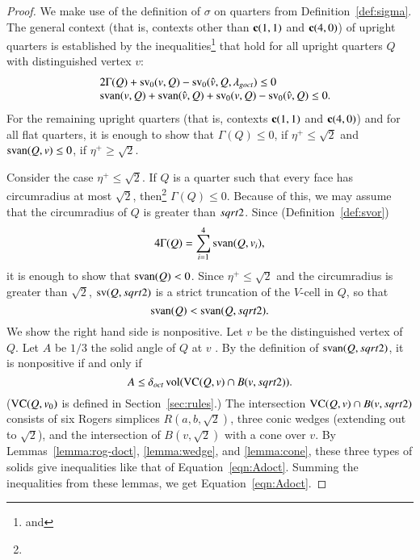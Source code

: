 \begin{proof}  
We make use
of the definition of $\sigma$ on quarters from
Definition~\ref{def:sigma}. The general context (that is, contexts
other than ${\operatorname{\bf c}}{(1,1)}$ and ${\operatorname{\bf c}}{(4,0)}$) of upright quarters is established
by the inequalities\footnote{ and
} that hold for all upright quarters $Q$ with
distinguished vertex $v$:
    $$
    \begin{array}{lll}
    &2\Gamma(Q) + {\operatorname{sv}}_0(v,Q) - {\operatorname{sv}}_0(\hat v,Q,\lambda_{goct}) \le 0\\
    &{\operatorname{svan}}(v,Q) + {\operatorname{svan}}(\hat v,Q) 
  +{\operatorname{sv}}_0(v,Q) - {\operatorname{sv}}_0(\hat v,Q)\le0.
    \end{array}
    $$
For the remaining upright quarters (that is, contexts ${\operatorname{\bf c}}{(1,1)}$ and ${\operatorname{\bf c}}{(4,0)}$)
and for all flat quarters,
it is enough to show that $\Gamma(Q)\le0$, if $\eta^+\le\sqrt2$ and
${\operatorname{svan}}(Q,v)\le0$, if $\eta^+\ge\sqrt2$.

Consider the case $\eta^+\le\sqrt2$.  If $Q$ is a quarter such that
every face has circumradius at most $\sqrt2$,
then\footnote{} $\Gamma(Q)\le0$.  
Because of this, we may assume that the circumradius of $Q$ is
greater than $sqrt2$. 
Since
(Definition~\ref{def:svor})
    $$4\Gamma(Q)=\sum_{i=1}^4 {\operatorname{svan}}(Q,v_i),$$
it is enough to show that ${\operatorname{svan}}(Q)<0$.  Since $\eta^+\le\sqrt2$ 
and the circumradius is greater than
$\sqrt2$, ${\operatorname{sv}}(Q,sqrt2)$ is a strict truncation of the $V$-cell
in $Q$, so that
    $${\operatorname{svan}}(Q)<{\operatorname{svan}}(Q,sqrt2).$$
We show the right hand side is nonpositive.  Let $v$ be the
distinguished vertex of $Q$.  Let $A$ be $1/3$ the solid angle of
$Q$ at $v$ . By the definition of ${\operatorname{svan}}(Q,sqrt2)$, it is
nonpositive if and only if
    \begin{equation}
        A\le \delta_{oct} \,{\operatorname{vol}}({\operatorname{VC}}(Q,v)\cap B(v,sqrt2)).
        \label{eqn:Adoct}
    \end{equation}
(${\operatorname{VC}}(Q,v_0)$ is defined in Section~\ref{sec:rules}.) The
intersection ${\operatorname{VC}}(Q,v)\cap B(v,sqrt2)$ consists of six Rogers
simplices $R(a,b,\sqrt2)$, three conic wedges (extending out to
$\sqrt2$), and the intersection of $B(v,\sqrt2)$ with a cone over
$v$. By Lemmas~\ref{lemma:rog-doct}, \ref{lemma:wedge}, and
\ref{lemma:cone}, these three types of solids give inequalities like
that of Equation~\ref{eqn:Adoct}. Summing the inequalities from
these lemmas, we get Equation~\ref{eqn:Adoct}.


\end{proof}
